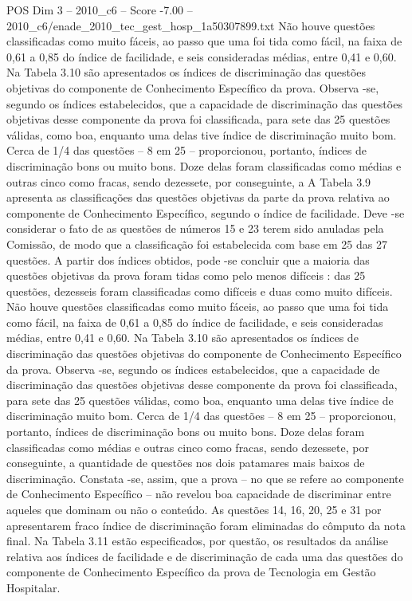 \begin{textsample}{POS Dim 3 – 2010\_c6 – Score -7.00 – 2010\_c6/enade\_2010\_tec\_gest\_hosp\_1a50307899.txt}
Não houve questões classificadas como muito fáceis, ao passo que uma foi tida como fácil, na faixa de 0,61 a 0,85 do índice de facilidade, e seis consideradas médias, entre 0,41 e 0,60.
Na Tabela 3.10 são apresentados os índices de discriminação das questões objetivas do componente de Conhecimento Específico da prova.
Observa -se, segundo os índices estabelecidos, que a capacidade de discriminação das questões objetivas desse componente da prova foi classificada, para sete das 25 questões válidas, como boa, enquanto uma delas tive índice de discriminação muito bom.
Cerca de 1/4 das questões – 8 em 25 – proporcionou, portanto, índices de discriminação bons ou muito bons.
Doze delas foram classificadas como médias e outras cinco como fracas, sendo dezessete, por conseguinte, a A Tabela 3.9 apresenta as classificações das questões objetivas da parte da prova relativa ao componente de Conhecimento Específico, segundo o índice de facilidade.
Deve -se considerar o fato de as questões de números 15 e 23 terem sido anuladas pela Comissão, de modo que a classificação foi estabelecida com base em 25 das 27 questões.
A partir dos índices obtidos, pode -se concluir que a maioria das questões objetivas da prova foram tidas como pelo menos difíceis : das 25 questões, dezesseis foram classificadas como difíceis e duas como muito difíceis.
Não houve questões classificadas como muito fáceis, ao passo que uma foi tida como fácil, na faixa de 0,61 a 0,85 do índice de facilidade, e seis consideradas médias, entre 0,41 e 0,60.
Na Tabela 3.10 são apresentados os índices de discriminação das questões objetivas do componente de Conhecimento Específico da prova.
Observa -se, segundo os índices estabelecidos, que a capacidade de discriminação das questões objetivas desse componente da prova foi classificada, para sete das 25 questões válidas, como boa, enquanto uma delas tive índice de discriminação muito bom.
Cerca de 1/4 das questões – 8 em 25 – proporcionou, portanto, índices de discriminação bons ou muito bons.
Doze delas foram classificadas como médias e outras cinco como fracas, sendo dezessete, por conseguinte, a quantidade de questões nos dois patamares mais baixos de discriminação.
Constata -se, assim, que a prova – no que se refere ao componente de Conhecimento Específico – não revelou boa capacidade de discriminar entre aqueles que dominam ou não o conteúdo.
As questões 14, 16, 20, 25 e 31 por apresentarem fraco índice de discriminação foram eliminadas do cômputo da nota final.
Na Tabela 3.11 estão especificados, por questão, os resultados da análise relativa aos índices de facilidade e de discriminação de cada uma das questões do componente de Conhecimento Específico da prova de Tecnologia em Gestão Hospitalar.

\end{textsample}
